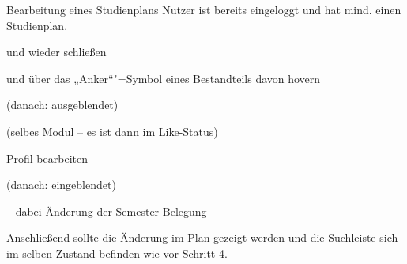 \begin{scenario*}{Bearbeitung eines Studienplans}
	{Nutzer ist bereits eingeloggt und hat mind. einen Studienplan.}
	\item {}
	\item {} 
	\item {} und wieder schließen
	\item {}
	\item {}
	\item {} 
	\item {} und über das „Anker“"=Symbol eines Bestandteils davon hovern
	\item {} (danach: ausgeblendet)
	\item {}
	\item {}
	\item {}
	\item {} (selbes Modul – es ist dann im Like-Status) 
	\item {}
	\item {}
	\item {}
\end{scenario*}

\begin{scenario}{Profil bearbeiten}
	\item {}
	\item {} (danach: eingeblendet)
	\item {}
	\item {} – dabei Änderung der Semester-Belegung
	\item Anschließend sollte die Änderung im Plan gezeigt werden und die Suchleiste sich im selben Zustand befinden wie vor Schritt 4.
\end{scenario}

